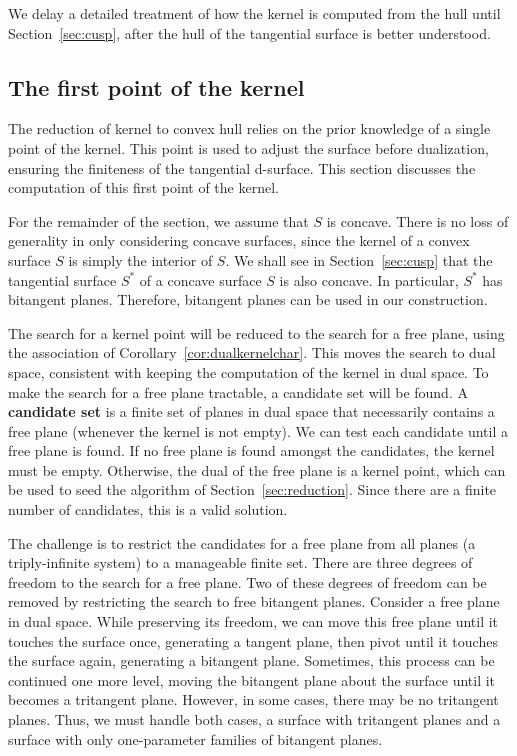 \documentclass[12pt]{article}
\begin{document}
We delay a detailed treatment of how the kernel is computed from the hull
until Section~\ref{sec:cusp}, after the hull of the tangential surface is better understood.


\subsection{The first point of the kernel}
\label{sec:firstpt}

The reduction of kernel to convex hull relies on the prior knowledge
of a single point of the kernel.
This point is used to adjust the surface before dualization, ensuring
the finiteness of the tangential d-surface.
This section discusses the computation of this first point of the kernel.

For the remainder of the section, we assume that $S$ is concave.
There is no loss of generality in only considering concave surfaces,
since the kernel of a convex surface $S$ is simply the interior of $S$.
We shall see in Section~\ref{sec:cusp} that the tangential surface $S^*$ of
a concave surface $S$ is also concave.
In particular, $S^*$ has bitangent planes.
Therefore, bitangent planes can be used in our construction. %

The search for a kernel point will be reduced to the search for a free plane,
using the association of Corollary~\ref{cor:dualkernelchar}.
This moves the search to dual space, consistent with keeping the computation
of the kernel in dual space.
To make the search for a free plane tractable, a candidate set will be found.
A {\bf candidate set} is a finite set of planes in dual space
that necessarily contains a free plane (whenever the kernel is not empty).
We can test each candidate until a free plane is found.
If no free plane is found amongst the candidates,
the kernel must be empty.
Otherwise, the dual of the free plane is a kernel point,
which can be used to seed the algorithm of Section~\ref{sec:reduction}.
Since there are a finite number of candidates, this is a valid solution.

The challenge is to restrict the candidates for a free plane from
all planes (a triply-infinite system) to a manageable finite set.
There are three degrees of freedom to the search for a free plane.
Two of these degrees of freedom can be removed by restricting the search
to free bitangent planes.
Consider a free plane in dual space.
While preserving its freedom, we can move this free plane
until it touches the surface once, generating a tangent plane,
then pivot until it touches the surface again, generating a bitangent plane.
Sometimes, this process can be continued one more level,
moving the bitangent plane about the surface until it becomes a
tritangent plane.
However, in some cases, there may be no tritangent planes.
Thus, we must handle both cases, a surface with tritangent planes
and a surface with only one-parameter families of bitangent planes.
\end{document}
